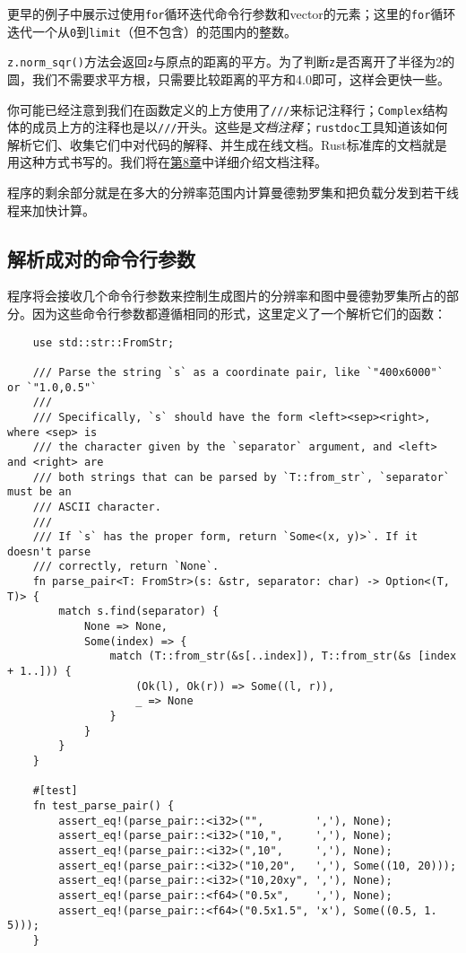 更早的例子中展示过使用\texttt{for}循环迭代命令行参数和vector的元素；这里的\texttt{for}循环迭代一个从\texttt{0}到\texttt{limit}（但不包含）的范围内的整数。

\texttt{z.norm\_sqr()}方法会返回\texttt{z}与原点的距离的平方。为了判断\texttt{z}是否离开了半径为2的圆，我们不需要求平方根，只需要比较距离的平方和4.0即可，这样会更快一些。

你可能已经注意到我们在函数定义的上方使用了\texttt{///}来标记注释行；\texttt{Complex}结构体的成员上方的注释也是以\texttt{///}开头。这些是\emph{文档注释}；\texttt{rustdoc}工具知道该如何解析它们、收集它们中对代码的解释、并生成在线文档。Rust标准库的文档就是用这种方式书写的。我们将在\hyperref[ch08]{第8章}中详细介绍文档注释。

程序的剩余部分就是在多大的分辨率范围内计算曼德勃罗集和把负载分发到若干线程来加快计算。

\subsection{解析成对的命令行参数}
程序将会接收几个命令行参数来控制生成图片的分辨率和图中曼德勃罗集所占的部分。因为这些命令行参数都遵循相同的形式，这里定义了一个解析它们的函数：
\begin{verbatim}
    use std::str::FromStr;

    /// Parse the string `s` as a coordinate pair, like `"400x6000"` or `"1.0,0.5"`
    ///
    /// Specifically, `s` should have the form <left><sep><right>, where <sep> is
    /// the character given by the `separator` argument, and <left> and <right> are
    /// both strings that can be parsed by `T::from_str`, `separator` must be an
    /// ASCII character.
    ///
    /// If `s` has the proper form, return `Some<(x, y)>`. If it doesn't parse
    /// correctly, return `None`.
    fn parse_pair<T: FromStr>(s: &str, separator: char) -> Option<(T, T)> {
        match s.find(separator) {
            None => None,
            Some(index) => {
                match (T::from_str(&s[..index]), T::from_str(&s [index + 1..])) {
                    (Ok(l), Ok(r)) => Some((l, r)),
                    _ => None
                }
            }
        }
    }

    #[test]
    fn test_parse_pair() {
        assert_eq!(parse_pair::<i32>("",        ','), None);
        assert_eq!(parse_pair::<i32>("10,",     ','), None);
        assert_eq!(parse_pair::<i32>(",10",     ','), None);
        assert_eq!(parse_pair::<i32>("10,20",   ','), Some((10, 20)));
        assert_eq!(parse_pair::<i32>("10,20xy", ','), None);
        assert_eq!(parse_pair::<f64>("0.5x",    ','), None);
        assert_eq!(parse_pair::<f64>("0.5x1.5", 'x'), Some((0.5, 1. 5)));
    }
\end{verbatim}

